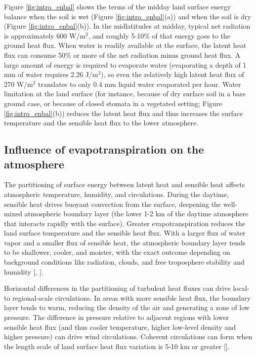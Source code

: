 Figure \ref{fig:intro_enbal} shows the terms of the midday land surface energy balance when the soil is wet (Figure \ref{fig:intro_enbal}(a)) and when the soil is dry (Figure \ref{fig:intro_enbal}(b)).  In the midlatitudes at midday, typical net radiation is approximately 600 W/m$^2$, and roughly 5-10\% of that energy goes to the ground heat flux.  When water is readily available at the surface, the latent heat flux can consume 50\% or more of the net radiation minus ground heat flux.  A large amount of energy is required to evaporate water (evaporating a depth of 1 mm of water requires 2.26 J/m$^2$), so even the relatively high latent heat flux of 270 W/m$^2$ translates to only 0.4 mm liquid water evaporated per hour.  Water limitation at the land surface (for instance, because of dry surface soil in a bare ground case, or because of closed stomata in a vegetated setting; Figure \ref{fig:intro_enbal}(b)) reduces the latent heat flux and thus increases the surface temperature and the sensible heat flux to the lower atmosphere.

\subsection{Influence of evapotranspiration on the atmosphere}

The partitioning of surface energy between latent heat and sensible heat affects atmospheric temperature, humidity, and circulations.  During the daytime, sensible heat drives buoyant convection from the surface, deepening the well-mixed atmospheric boundary layer (the lower 1-2 km of the daytime atmosphere that interacts rapidly with the surface).  Greater evapotranspiration reduces the land surface temperature and the sensible heat flux.  With a larger flux of water vapor and a smaller flux of sensible heat, the atmospheric boundary layer tends to be shallower, cooler, and moister, with the exact outcome depending on background conditions like radiation, clouds, and free troposphere stability and humidity [\cite{bonan}, \cite{garratt1994atmospheric}].

Horizontal differences in the partitioning of turbulent heat fluxes can drive local- to regional-scale circulations.  In areas with more sensible heat flux, the boundary layer tends to warm, reducing the density of the air and generating a zone of low pressure.  The difference in pressure relative to adjacent regions with lower sensible heat flux (and thus cooler temperature, higher low-level density and higher pressure) can drive wind circulations.  Coherent circulations can form when the length scale of land surface heat flux variation is 5-10 km or greater [\cite{avissar1998evaluation}].

